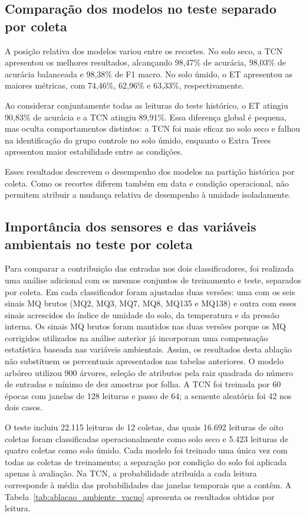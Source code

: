 \subsection{Comparação dos modelos no teste separado por coleta}

A posição relativa dos modelos variou entre os recortes. No solo seco, a
TCN apresentou os melhores resultados, alcançando 98,47\% de acurácia,
98,03\% de acurácia balanceada e 98,38\% de F1 macro. No solo úmido, o ET
apresentou as maiores métricas, com 74,46\%, 62,96\% e 63,33\%, respectivamente.

Ao considerar conjuntamente todas as leituras do teste histórico, o ET
atingiu 90,83\% de acurácia e a TCN atingiu 89,91\%. Essa diferença
global é pequena, mas oculta comportamentos distintos: a TCN foi mais eficaz
no solo seco e falhou na identificação do grupo controle no solo úmido,
enquanto o Extra Trees apresentou maior estabilidade entre as condições.

Esses resultados descrevem o desempenho dos modelos na partição
histórica por coleta. Como os recortes diferem também em data e condição
operacional, não permitem atribuir a mudança relativa de desempenho à
umidade isoladamente.

\subsection{Importância dos sensores e das variáveis ambientais no teste por coleta}


Para comparar a contribuição das entradas nos dois classificadores, foi
realizada uma análise adicional com os mesmos conjuntos de treinamento e teste,
separados por coleta. Em cada classificador foram ajustadas duas versões: uma
com os seis sinais MQ brutos (MQ2, MQ3, MQ7, MQ8, MQ135 e MQ138) e outra com
esses sinais acrescidos do índice de umidade do solo, da temperatura e da
pressão interna. Os sinais MQ brutos foram mantidos nas duas versões porque os
MQ corrigidos utilizados na análise anterior já incorporam uma compensação
estatística baseada nas variáveis ambientais. Assim, os resultados desta
ablação não substituem os percentuais apresentados nas tabelas anteriores.
O modelo arbóreo utilizou 900 árvores, seleção de atributos pela raiz
quadrada do número de entradas e mínimo de dez amostras por folha. A TCN
foi treinada por 60 épocas com janelas de 128 leituras e passo de 64; a
semente aleatória foi 42 nos dois casos.

O teste incluiu 22.115 leituras de 12 coletas, das quais 16.692 leituras de
oito coletas foram classificadas operacionalmente como solo seco e 5.423
leituras de quatro coletas como solo úmido. Cada modelo foi treinado uma única
vez com todas as coletas de treinamento; a separação por condição do solo foi
aplicada apenas à avaliação. Na TCN, a probabilidade atribuída a cada
leitura corresponde à média das probabilidades das janelas temporais que a
contêm. A Tabela~\ref{tab:ablacao_ambiente_vacuo} apresenta os resultados
obtidos por leitura.

